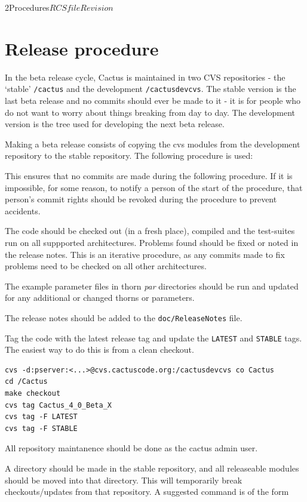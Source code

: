 \begin{cactuspart}{2}{Procedures}{$RCSfile$}{$Revision$}
\chapter{Release procedure}

In the beta release cycle, Cactus is maintained in two CVS
repositories - the `stable' \verb./cactus. and the development
\verb./cactusdevcvs..  The stable version is the last beta release and 
no commits should ever be made to it - it is for people who do not
want to worry about things breaking from day to day.  The development
version is the tree used for developing the next beta release.

Making a beta release consists of copying the cvs modules from the
development repository to the stable repository.  The following
procedure is used:

\begin{Lentry}
\item[{\em Notify committers of start of release procedure}]
This ensures that no commits are made during the following procedure.
If it is impossible, for some reason, to notify a person of the start
of the procedure, that person's commit rights should be revoked during 
the procedure to prevent accidents.
\item[{\em Check the code on all supported architectures}]
The code should be checked out (in a fresh place), compiled and the
test-suites run on all suppported architectures.  Problems found
should be fixed or noted in the release notes.  This is an iterative
procedure, as any commits made to fix problems need to be checked on
all other architectures.
\item[{\em Check example parameter files}]
The example parameter files in thorn {\em par} directories should be
run and updated for any additional or changed thorns or parameters.
\item[{\em Update ReleaseNotes}]
The release notes should be added to the \verb|doc/ReleaseNotes| file.
\item[{\em Tag the code}]
Tag the code with the latest release tag and update the {\tt LATEST}
and {\tt STABLE} tags.  The easiest way to do this is from a clean
checkout.
\begin{verbatim}
cvs -d:pserver:<...>@cvs.cactuscode.org:/cactusdevcvs co Cactus
cd /Cactus
make checkout
cvs tag Cactus_4_0_Beta_X
cvs tag -F LATEST
cvs tag -F STABLE
\end{verbatim}

\item[{\em Log into cvs machine as cactus\_admin}]
All repository maintanence should be done as the cactus admin user.
\item[{\em Store old module files}]
A directory should be made in the stable repository, and all
releaseable modules should be moved into that directory.  This will
temporarily break checkouts/updates from that repository.  A suggested 
command is of the form


\end{Lentry}
\end{cactuspart}
